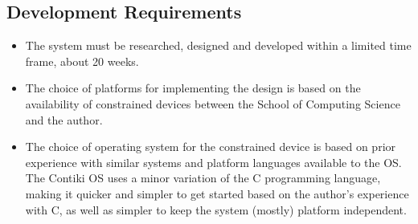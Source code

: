 
\subsection{Development Requirements} %
\label{sub:development_requirements}
\begin{itemize}
	\item The system must be researched, designed and developed within a limited time frame, about 20 weeks.
	\item The choice of platforms for implementing the design is based on the availability of constrained devices between the School of Computing Science and the author.
	\item The choice of operating system for the constrained device is based on prior experience with similar systems and platform languages available to the OS. The Contiki OS uses a minor variation of the C programming language, making it quicker and simpler to get started based on the author's experience with C, as well as simpler to keep the system (mostly) platform independent.
\end{itemize}







